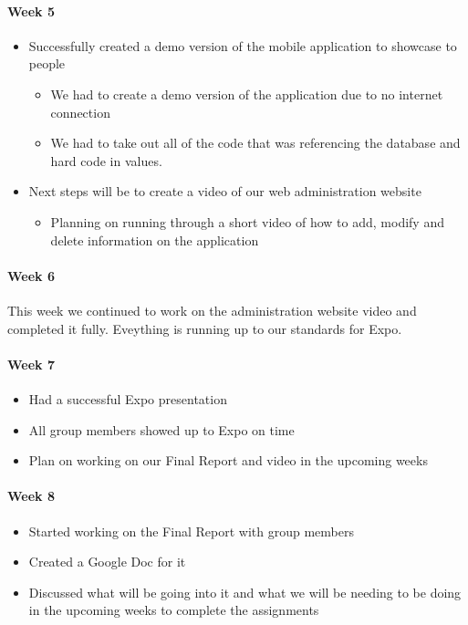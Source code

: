 \documentclass[onecolumn, draftclsnofoot,10pt, compsoc]{IEEEtran}
\begin{document}
      \paragraph{Week 5}
        \begin{itemize}
          \item Successfully created a demo version of the mobile application to showcase to people
          \begin{itemize}
            \item We had to create a demo version of the application due to no internet connection
            \item We had to take out all of the code that was referencing the database and hard code in values.
          \end{itemize}
          \item Next steps will be to create a video of our web administration website
          \begin{itemize}
            \item Planning on running through a short video of how to add, modify and delete information on the application
          \end{itemize}
        \end{itemize}

      \paragraph{Week 6}
      This week we continued to work on the administration website video and completed it fully. Eveything is running up to our standards for Expo.

      \paragraph{Week 7}
        \begin{itemize}
          \item Had a successful Expo presentation
          \item All group members showed up to Expo on time
          \item Plan on working on our Final Report and video in the upcoming weeks
        \end{itemize}

      \paragraph{Week 8}
        \begin{itemize}
          \item Started working on the Final Report with group members
          \item Created a Google Doc for it
          \item Discussed what will be going into it and what we will be needing to be doing in the upcoming weeks to complete the assignments
        \end{itemize}
\end{document}

